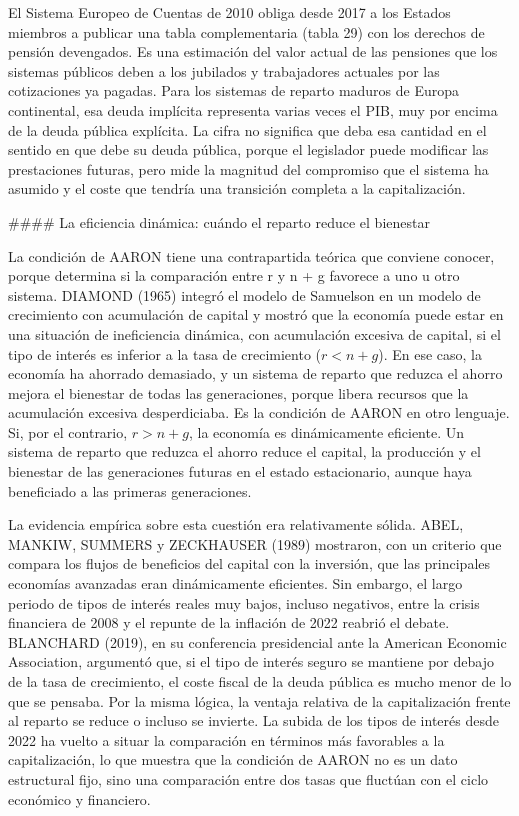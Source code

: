 \documentclass[10pt,a4paper]{article}
\begin{document}
El Sistema Europeo de Cuentas de 2010 obliga desde 2017 a los Estados miembros a publicar una tabla complementaria (tabla 29) con los derechos de pensión devengados. Es una estimación del valor actual de las pensiones que los sistemas públicos deben a los jubilados y trabajadores actuales por las cotizaciones ya pagadas. Para los sistemas de reparto maduros de Europa continental, esa deuda implícita representa varias veces el PIB, muy por encima de la deuda pública explícita. La cifra no significa que deba esa cantidad en el sentido en que debe su deuda pública, porque el legislador puede modificar las prestaciones futuras, pero mide la magnitud del compromiso que el sistema ha asumido y el coste que tendría una transición completa a la capitalización.

#### La eficiencia dinámica: cuándo el reparto reduce el bienestar

La condición de AARON tiene una contrapartida teórica que conviene conocer, porque determina si la comparación entre r y n + g favorece a uno u otro sistema. DIAMOND (1965) integró el modelo de Samuelson en un modelo de crecimiento con acumulación de capital y mostró que la economía puede estar en una situación de ineficiencia dinámica, con acumulación excesiva de capital, si el tipo de interés es inferior a la tasa de crecimiento ($r < n + g$). En ese caso, la economía ha ahorrado demasiado, y un sistema de reparto que reduzca el ahorro mejora el bienestar de todas las generaciones, porque libera recursos que la acumulación excesiva desperdiciaba. Es la condición de AARON en otro lenguaje. Si, por el contrario, $r > n + g$, la economía es dinámicamente eficiente. Un sistema de reparto que reduzca el ahorro reduce el capital, la producción y el bienestar de las generaciones futuras en el estado estacionario, aunque haya beneficiado a las primeras generaciones.

La evidencia empírica sobre esta cuestión era relativamente sólida. ABEL, MANKIW, SUMMERS y ZECKHAUSER (1989) mostraron, con un criterio que compara los flujos de beneficios del capital con la inversión, que las principales economías avanzadas eran dinámicamente eficientes. Sin embargo, el largo periodo de tipos de interés reales muy bajos, incluso negativos, entre la crisis financiera de 2008 y el repunte de la inflación de 2022 reabrió el debate. BLANCHARD (2019), en su conferencia presidencial ante la American Economic Association, argumentó que, si el tipo de interés seguro se mantiene por debajo de la tasa de crecimiento, el coste fiscal de la deuda pública es mucho menor de lo que se pensaba. Por la misma lógica, la ventaja relativa de la capitalización frente al reparto se reduce o incluso se invierte. La subida de los tipos de interés desde 2022 ha vuelto a situar la comparación en términos más favorables a la capitalización, lo que muestra que la condición de AARON no es un dato estructural fijo, sino una comparación entre dos tasas que fluctúan con el ciclo económico y financiero.
\end{document}
